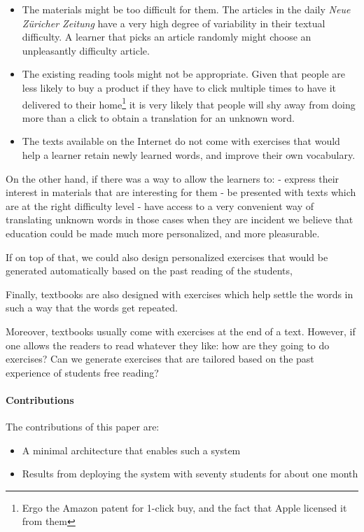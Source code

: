 \begin{itemize}
	
  \item The materials might be too difficult for them. The articles in the  daily {\em Neue Z\"uricher Zeitung} have a very high degree of variability in their textual difficulty. A learner that picks an article randomly might choose an unpleasantly difficulty article.

  \item The existing reading tools might not be appropriate. Given that people are less likely to buy a product if they have to click multiple times to have it delivered to their home\footnote{Ergo the Amazon patent for 1-click buy, and the fact that Apple licensed it from them} it is very likely that people will shy away from doing more than a click to obtain a translation for an unknown word.

  \item The texts available on the Internet do not come with exercises that would help a learner retain newly learned words, and improve their own vocabulary. 
  
\end{itemize}

On the other hand, if there was a way to allow the learners to:
- express their interest in materials that are interesting for them
- be presented with texts which are at the right difficulty level
- have access to a very convenient way of translating unknown words in those cases when they are incident
we believe that education could be made much more personalized, and more pleasurable. 

If on top of that, we could also design personalized exercises that would be generated automatically based on the past reading of the students, 



Finally, textbooks are also designed with exercises which help settle the words in such a way that the words get repeated.

Moreover, textbooks usually come with exercises at the end of a text. However, if one allows the readers to read whatever they like: how are they going to do exercises? Can we generate exercises that are tailored based on the past experience of students free reading?

\paragraph{Contributions}
The contributions of this paper are: 
\begin{itemize}
	\item A minimal architecture that enables such a system
	\item Results from deploying the system with seventy students for about one month
\end{itemize}
